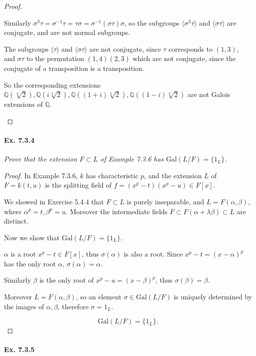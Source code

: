 \documentclass[11pt,a4paper]{article}
\newcommand{\Q}{\mathbb{Q}}
\newcommand{\Gal}{\mathrm{Gal}}
\begin{document}
\begin{proof}
\begin{enumerate}
 
Similarly $\sigma^3 \tau = \sigma^{-1} \tau = \tau \sigma = \sigma^{-1}(\sigma \tau) \sigma$, so the subgroups $\langle \sigma^3 \tau \rangle$ and $\langle \sigma \tau \rangle$ are conjugate, and are not normal subgroups.
 
The subgroups $\langle \tau \rangle$ and $\langle \sigma \tau \rangle$ are not conjugate, since $\tau$ corresponds to $(1,3)$, and $\sigma \tau$ to the permutation $(1,4)(2,3)$ which are not conjugate, since the conjugate of a transposition is a transposition.
 
So the corresponding extensions  $\Q(\sqrt[4]{2}), \Q(i\sqrt[4]{2}), \Q((1+i)\sqrt[4]{2}), \Q((1-i)\sqrt[4]{2})$ are not Galois extensions of $\Q$.
 
\end{enumerate}
\end{proof}

\paragraph{Ex. 7.3.4}

{\it  Prove that the extension $F\subset L$ of Example 7.3.6 has $\Gal(L/F) = \{1_L\}$.
}

\begin{proof}
In Example 7.3.6, $k$ has characteristic $p$, and the extension $L$ of $F = k(t,u)$ is the splitting field of $f =(x^p - t)(x^p-u) \in F[x]$.

We showed in Exercise 5.4.4 that $F \subset L$ is purely inseparable, and $L=F(\alpha,\beta)$, where $\alpha^p = t, \beta^p=u$.
Moreover the intermediate fields $F \subset F(\alpha+\lambda \beta) \subset L$ are distinct.

Now we show that $\Gal(L/F) = \{1_L\}$.

$\alpha$ is a root $x^p -t \in F[x]$, thus $\sigma(\alpha)$ is also a root. Since $x^p - t = (x-\alpha)^p$ has the only root $\alpha$, $\sigma(\alpha) = \alpha$.

Similarly $\beta$ is the only root of $x^p - u =(x-\beta)^p$, thus $\sigma(\beta) = \beta$.

Moreover $L = F(\alpha,\beta)$, so an element $\sigma \in \Gal(L/F)$ is uniquely determined by the images of $\alpha,\beta$, therefore $\sigma = 1_L$.

$$\Gal(L/F) = \{1_L\}.$$
\end{proof}

\paragraph{Ex. 7.3.5}
\end{document}
